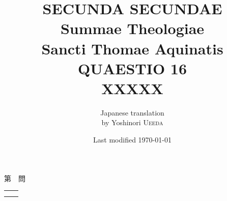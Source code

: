 \documentclass[paper=a4paper,fontsize=10pt,jafontsize=9pt,titlepage]{jlreq}
\title{{\bfseries SECUNDA SECUNDAE}\\{\Huge Summae Theologiae}\\Sancti Thomae
Aquinatis\\{\sffamily QUAESTIO 16}\\XXXXX}
\author{Japanese translation\\by Yoshinori {\scshape Ueeda}}
\date{Last modified \today}
\begin{document}
\maketitle
\pagestyle{fancy}

\begin{center}
{\Large 第　問\\}
\end{center}

\begin{longtable}{p{21em}p{21em}}


&



\\

&


\end{longtable}

\newpage
\end{document}
